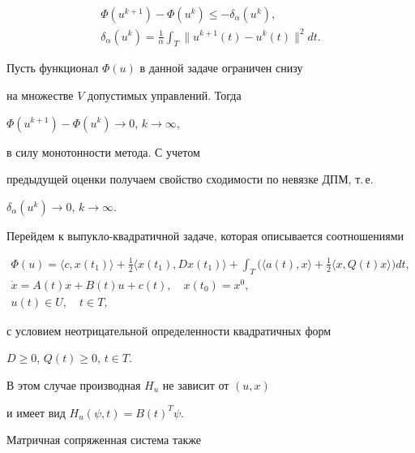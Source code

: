 \begin{gather*}


\Phi(u^{k+1}) - \Phi(u^{k}) \leq - \delta_{\alpha}(u^{k}),\\


\delta_{\alpha}(u^{k})=\frac{1}{\alpha} \int_{T}


\| u^{k+1}(t) - u^{k}(t)\|^{2} dt.


\end{gather*}





Пусть функционал $\Phi(u)$ в данной задаче ограничен снизу 


на множестве $V$ допустимых управлений. Тогда


$\Phi(u^{k+1}) - \Phi(u^{k}) \rightarrow 0$, $k \rightarrow \infty$, 


в силу монотонности метода. С учетом


предыдущей оценки получаем свойство сходимости по невязке ДПМ, т.\,е.


$\delta_{\alpha}(u^{k}) \rightarrow0$, $k \rightarrow \infty$.





Перейдем к выпукло-квадратичной задаче, которая описывается соотношениями


\begin{gather*}


\Phi(u)=\langle c, x(t_{1})\rangle+\frac{1}{2}


\langle x(t_{1}), D x(t_{1})\rangle+\int_{T}


\Big(\langle a(t), x\rangle+\frac{1}{2} \langle x, Q(t) x\rangle\Big)dt,\\


\Dot{x}=A(t)x+B(t)u+c(t),\quad x(t_{0})=x^{0},\\


u(t) \in U,\quad t \in T,


\end{gather*}


с условием неотрицательной определенности квадратичных форм


$D \geq 0$, $Q(t) \geq 0$, $t \in T$.





В этом случае производная $H_{u}$ не зависит от $(u, x)$ 


и имеет вид $H_{u}(\psi, t)=B(t)^{T} \psi$. 


Матричная сопряженная система также



